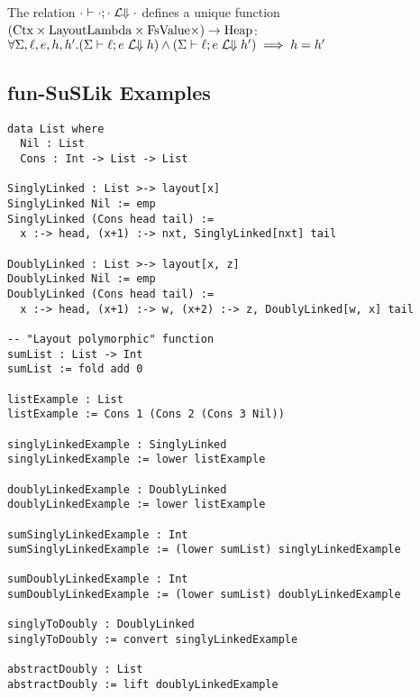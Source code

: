 \documentclass[10pt]{article}
\begin{document}


\begin{lemma}
  The relation $\cdot \vdash \cdot; \cdot\;\mathcal{L}\!\!\Downarrow\cdot$ defines a unique function $(\textnormal{Ctx} \times \textnormal{LayoutLambda} \times \textnormal{FsValue} \times) \rightarrow \textnormal{Heap}$:\\
  $\forall \Sigma, \ell, e, h, h'. (\Sigma \vdash \ell;e \;\mathcal{L}\!\!\Downarrow h) \land (\Sigma \vdash \ell;e \;\mathcal{L}\!\!\Downarrow h') \implies h = h'$
\end{lemma}

\subsection{fun-SuSLik Examples}

\begin{lstlisting}
data List where
  Nil : List
  Cons : Int -> List -> List

SinglyLinked : List >-> layout[x]
SinglyLinked Nil := emp
SinglyLinked (Cons head tail) :=
  x :-> head, (x+1) :-> nxt, SinglyLinked[nxt] tail

DoublyLinked : List >-> layout[x, z]
DoublyLinked Nil := emp
DoublyLinked (Cons head tail) := 
  x :-> head, (x+1) :-> w, (x+2) :-> z, DoublyLinked[w, x] tail

-- "Layout polymorphic" function
sumList : List -> Int
sumList := fold add 0

listExample : List
listExample := Cons 1 (Cons 2 (Cons 3 Nil))

singlyLinkedExample : SinglyLinked
singlyLinkedExample := lower listExample

doublyLinkedExample : DoublyLinked
doublyLinkedExample := lower listExample

sumSinglyLinkedExample : Int
sumSinglyLinkedExample := (lower sumList) singlyLinkedExample

sumDoublyLinkedExample : Int
sumDoublyLinkedExample := (lower sumList) doublyLinkedExample

singlyToDoubly : DoublyLinked
singlyToDoubly := convert singlyLinkedExample

abstractDoubly : List
abstractDoubly := lift doublyLinkedExample
\end{lstlisting}
\end{document}
